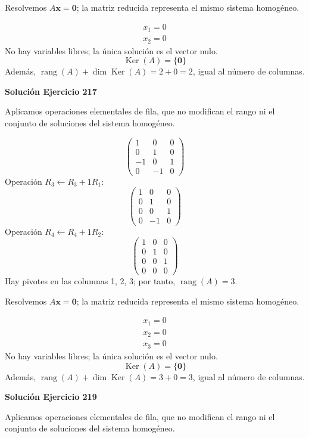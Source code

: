 \documentclass[12pt]{article}
\newcommand{\rang}{\operatorname{rang}}
\newcommand{\Ker}{\operatorname{Ker}}
\newcommand{\vect}[1]{\boldsymbol{#1}}
\begin{document}
Resolvemos $A\vect x=\vect0$; la matriz reducida representa el mismo sistema homogéneo.

\[
\begin{aligned}x_{1}=0\\x_{2}=0\end{aligned}
\]
No hay variables libres; la única solución es el vector nulo.
\[
\boxed{\Ker(A)=\{\vect0\}}
\]
Además, $\rang(A)+\dim\Ker(A)=2+0=2$, igual al número de columnas.


\par\bigskip\noindent\textbf{Solución Ejercicio 217}\par\nobreak
Aplicamos operaciones elementales de fila, que no modifican el rango ni el conjunto de soluciones del sistema homogéneo.

\[
\begin{pmatrix}1&0&0\\0&1&0\\-1&0&1\\0&-1&0\end{pmatrix}
\]
Operación $R_{3}\leftarrow R_{3}+1R_{1}$:
\[
\begin{pmatrix}1&0&0\\0&1&0\\0&0&1\\0&-1&0\end{pmatrix}
\]
Operación $R_{4}\leftarrow R_{4}+1R_{2}$:
\[
\begin{pmatrix}1&0&0\\0&1&0\\0&0&1\\0&0&0\end{pmatrix}
\]
Hay pivotes en las columnas 1, 2, 3; por tanto, $\boxed{\rang(A)=3}$.

Resolvemos $A\vect x=\vect0$; la matriz reducida representa el mismo sistema homogéneo.

\[
\begin{aligned}x_{1}=0\\x_{2}=0\\x_{3}=0\end{aligned}
\]
No hay variables libres; la única solución es el vector nulo.
\[
\boxed{\Ker(A)=\{\vect0\}}
\]
Además, $\rang(A)+\dim\Ker(A)=3+0=3$, igual al número de columnas.


\par\bigskip\noindent\textbf{Solución Ejercicio 219}\par\nobreak
Aplicamos operaciones elementales de fila, que no modifican el rango ni el conjunto de soluciones del sistema homogéneo.
\end{document}
